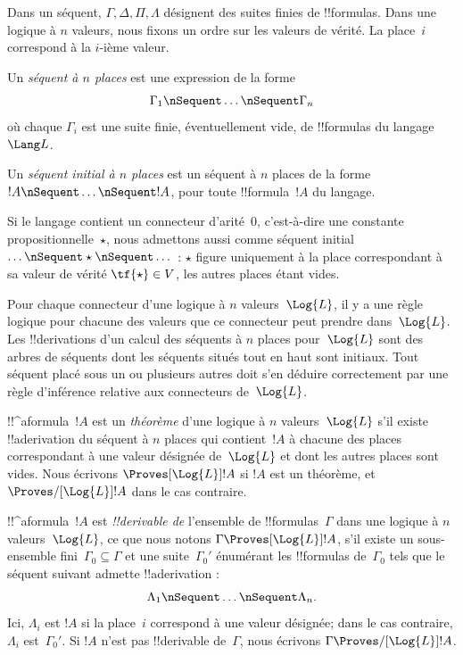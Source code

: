 \documentclass[../../../include/open-logic-section]{subfiles}
\begin{document}


Dans un séquent, $\Gamma, \Delta, \Pi, \Lambda$ désignent des suites
finies de !!{formula}s. Dans une logique à $n$ valeurs, nous fixons un
ordre sur les valeurs de vérité. La place~$i$ correspond à la
$i$-ième valeur.

\begin{defn}[Séquent]
Un \emph{séquent à $n$ places} est une expression de la forme
\[
\Gamma_1 \nSequent \dots \nSequent \Gamma_n
\]
où chaque $\Gamma_i$ est une suite finie, éventuellement vide,
de !!{formula}s du langage~$\Lang L$.
\end{defn}

\begin{defn}
Un \emph{séquent initial à $n$ places} est un séquent à $n$ places de la
forme $!A \nSequent \dots \nSequent !A$, pour toute !!{formula}~$!A$
du langage.

Si le langage contient un connecteur d'arité~$0$, c'est-à-dire une
constante propositionnelle~$\star$, nous admettons aussi comme séquent
initial $\dots \nSequent \star \nSequent \dots$ : $\star$ figure
uniquement à la place correspondant à sa valeur de vérité
$\tf{\star}\in V$, les autres places étant vides.
\end{defn}

Pour chaque connecteur d'une logique à $n$ valeurs~$\Log{L}$, il y a
une règle logique pour chacune des valeurs que ce connecteur peut
prendre dans~$\Log{L}$. Les !!{derivation}s d'un calcul des séquents
à $n$ places pour~$\Log{L}$ sont des arbres de séquents dont les
séquents situés tout en haut sont initiaux. Tout séquent placé sous un
ou plusieurs autres doit s'en déduire correctement par une règle
d'inférence relative aux connecteurs de~$\Log{L}$.

\begin{defn}[Théorèmes]
!!^a{formula}~$!A$ est un \emph{théorème} d'une logique à $n$
valeurs~$\Log{L}$ s'il existe !!a{derivation} du séquent à $n$ places
qui contient~$!A$ à chacune des places correspondant à une valeur
désignée de~$\Log{L}$ et dont les autres places sont vides. Nous
écrivons $\Proves[\Log{L}] !A$ si $!A$ est un théorème, et
$\Proves/[\Log{L}] !A$ dans le cas contraire.
\end{defn}

\begin{defn}[!!^{derivability}]
!!^a{formula}~$!A$ est \emph{!!{derivable} de} l'ensemble
de !!{formula}s~$\Gamma$ dans une logique à $n$ valeurs~$\Log{L}$,
ce que nous notons $\Gamma\Proves[\Log{L}] !A$, s'il existe un
sous-ensemble fini~$\Gamma_0\subseteq\Gamma$ et une suite~$\Gamma_0'$
énumérant les !!{formula}s de~$\Gamma_0$ tels que le séquent suivant
admette !!a{derivation} :
\[
\Lambda_1 \nSequent \dots \nSequent \Lambda_n.
\]
Ici, $\Lambda_i$ est $!A$ si la place~$i$ correspond à une valeur
désignée; dans le cas contraire, $\Lambda_i$ est~$\Gamma_0'$.
Si $!A$ n'est pas !!{derivable} de~$\Gamma$, nous écrivons
$\Gamma\Proves/[\Log{L}] !A$.
\end{defn}
\end{document}
